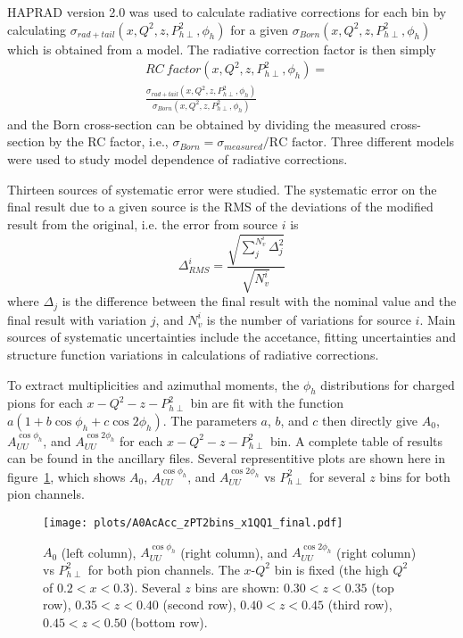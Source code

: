 \documentclass[aps,prl,twocolumn,showpacs,superscriptaddress,groupedaddress]{revtex4}  %
\begin{document}
HAPRAD version 2.0 \cite{Akushevich:1999hz,Akushevich:2007jc} was used to calculate radiative corrections for each bin by calculating $\sigma_{rad+tail} \left( x, Q^2, z, P_{h\perp}^2, \phi_h \right)$ for a given \allowbreak $\sigma_{Born} \left( x, Q^2, z, P_{h\perp}^2, \phi_h \right)$ which is obtained from a model.
The radiative correction factor is then simply
\begin{equation}
\begin{split}
\label{eq:RCfactor}
& RC\ factor \left( x, Q^2, z, P_{h\perp}^2, \phi_h \right) =
\\
& \frac{\sigma_{rad+tail} \left( x, Q^2, z, P_{h\perp}^2, \phi_h \right)}{\sigma_{Born} \left( x, Q^2, z, P_{h\perp}^2, \phi_h \right)}
\end{split}
\end{equation}
and the Born cross-section can be obtained by dividing the measured cross-section by the RC factor, i.e., $\sigma_{Born} = \sigma_{measured}/\text{RC factor}$.
Three different models were used to study model dependence of radiative corrections.

Thirteen sources of systematic error were studied.
The systematic error on the final result due to a given source is the RMS of the deviations of the modified result from the original, i.e. the error from source $i$ is
%
\begin{equation}
\label{eq:RMS}
\Delta_{RMS}^i = \frac{\sqrt{\sum_j^{N_v^i} \Delta_j^2}}{\sqrt{N_v^i}}
\end{equation}
%
where $\Delta_j$ is the difference between the final result with the nominal value and the final result with variation $j$, and $N_v^i$ is the number of variations for source $i$.
Main sources of systematic uncertainties include the accetance, fitting uncertainties and structure function variations in calculations of radiative corrections.


To extract multiplicities and azimuthal moments, the $\phi_h$ distributions for charged pions for each $x-Q^2-z-P_{h\perp}^2$ bin are fit with the function $a(1 + b\cos\phi_h + c\cos 2\phi_h)$.
The parameters $a$, $b$, and $c$ then directly give $A_0$, $A_{UU}^{\cos\phi_h}$, and $A_{UU}^{\cos 2\phi_h}$ for each $x-Q^2-z-P_{h\perp}^2$ bin.
A complete table of results can be found in the ancillary files.
Several representitive plots are shown here in figure~\ref{fig:A0AcAcc_zPT2bins_x1QQ1_final}, which shows $A_0$, $A_{UU}^{\cos\phi_h}$, and $A_{UU}^{\cos 2\phi_h}$ vs $P_{h\perp}^2$ for several $z$ bins for both pion channels.
%
\begin{figure}[htp]
\centering
\texttt{[image: plots/A0AcAcc\_zPT2bins\_x1QQ1\_final.pdf]}
\caption{$A_0$ (left column), $A_{UU}^{\cos\phi_h}$ (right column), and $A_{UU}^{\cos 2\phi_h}$ (right column) vs $P_{h\perp}^2$ for both pion channels. The $x$-$Q^2$ bin is fixed (the high $Q^2$ of $0.2 < x < 0.3$). Several $z$ bins are shown: $0.30 < z < 0.35$ (top row), $0.35 < z < 0.40$ (second row), $0.40 < z < 0.45$ (third row), $0.45 < z < 0.50$ (bottom row).}
\label{fig:A0AcAcc_zPT2bins_x1QQ1_final}
\end{figure}
\end{document}

